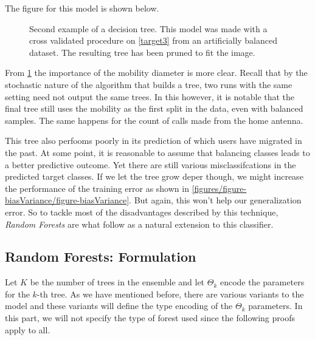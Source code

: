 The figure for this model is shown below.

\begin{figure}[tb]
\centering
\caption{ Second example of a decision tree. This model was made with a cross validated procedure on \cref{target3} from an artificially balanced dataset. The resulting tree has been pruned to fit the image.}
\label{fig:decision_tree_actual_problem}
\end{figure}

From \cref{fig:decision_tree_actual_problem} the importance of the mobility diameter is more clear.
Recall that by the stochastic nature of the algorithm that builds a tree, two runs with the same setting need not output the same trees.
In this however, it is notable that the final tree still uses the mobility as the first split in the data, even with balanced samples.
The same happens for the count of calls made from the home antenna.

This tree also perfooms poorly in its prediction of which users have migrated in the past.
At some point, it is reasonable to assume that balancing classes leads to a better predictive outcome.
Yet there are still various misclassifcations in the predicted target classes.
If we let the tree grow deper though, we might increase the performance of the training error as shown in \cref{figures/figure-biasVariance/figure-biasVariance}.
But again, this won't help our generalization error.
So to tackle most of the disadvantages described by this technique, \textit{Random Forests} are what follow as a natural extension to this classifier.


\subsection{ Random Forests: Formulation }


Let $K$ be the number of trees in the ensemble and let $\Theta_k$ encode the parameters for the $k$-th tree. As we have mentioned before, there are various variants to the model and these variants will define the type encoding of the $\Theta_k$ parameters. In this part, we will not specify the type of forest used since the following proofs apply to all.

